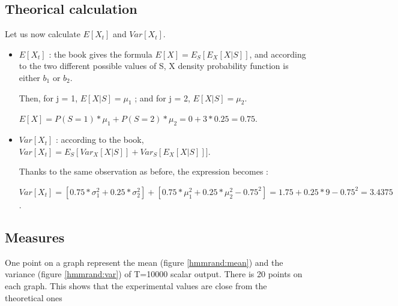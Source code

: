 \documentclass[a4paper]{report}
\begin{document}
\subsection{Theorical calculation}
Let us now calculate $E[X_{t}]$ and $Var[X_{t}]$.

\begin{itemize}
	\item 
	$E[X_{t}]$ : the book gives the formula $E[X]=E_{S}[E_{X}[X|S]]$, and according to the two different possible values of S, X density probability function is either $b_{1}$ or $b_{2}$.
	
	Then, for j = 1, $E[X|S]=\mu_{1}$ ;
	and for j = 2, $E[X|S]=\mu_{2}$.
	
	
	$E[X]=P(S=1)*\mu_{1} + P(S=2)*\mu_{2} = 0 + 3*0.25 = 0.75$.
	
\end{itemize}

\begin{itemize}
	\item $Var[X_{t}]$ : according to the book, $Var[X_{t}]=E_{S}[Var_{X}[X|S]] + Var_{S}[E_{X}[X|S]]]$.
	
	Thanks to the same observation as before, the expression becomes :
	
	$Var[X_{t}]=[0.75 * \sigma_{1}^2 + 0.25*\sigma_{2}^2] + [0.75*\mu_{1}^2+0.25*\mu_{2}^2 - 0.75^2] = 1.75+0.25*9-0.75^2=3.4375$.
\end{itemize}
\pagebreak
\subsection{Measures}
One point on a graph represent the mean (figure \ref{hmmrand:mean}) and the variance (figure  \ref{hmmrand:var}) of T=10000 scalar output. There is 20 points on each graph.  This shows that the experimental values are close from the theoretical ones
\end{document}
